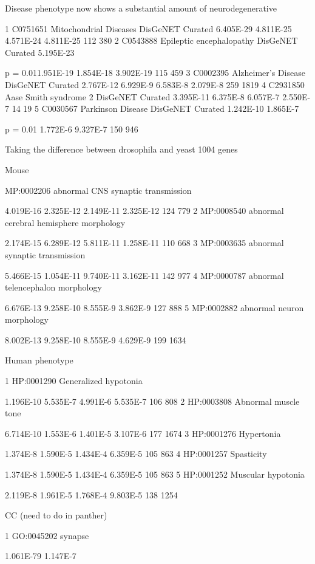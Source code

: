 Disease phenotype now shows a substantial amount of neurodegenerative


1 
C0751651 
Mitochondrial Diseases 
DisGeNET Curated 
6.405E-29 
4.811E-25 
4.571E-24 
4.811E-25 
112 
380 
2 
C0543888 
Epileptic encephalopathy 
DisGeNET Curated 
5.195E-23 


p = 0.011.951E-19 
1.854E-18 
3.902E-19 
115 
459 
3 
C0002395 
Alzheimer's Disease 
DisGeNET Curated 
2.767E-12 
6.929E-9 
6.583E-8 
2.079E-8 
259 
1819 
4 
C2931850 
Aase Smith syndrome 2 
DisGeNET Curated 
3.395E-11 
6.375E-8 
6.057E-7 
2.550E-7 
14 
19 
5 
C0030567 
Parkinson Disease 
DisGeNET Curated 
1.242E-10 
1.865E-7

p = 0.01 
1.772E-6 
9.327E-7 
150 
946


Taking the difference between drosophila and yeast 1004 genes

Mouse



MP:0002206 
abnormal CNS synaptic transmission 

4.019E-16 
2.325E-12 
2.149E-11 
2.325E-12 
124 
779 
2 
MP:0008540 
abnormal cerebral hemisphere morphology 

2.174E-15 
6.289E-12 
5.811E-11 
1.258E-11 
110 
668 
3 
MP:0003635 
abnormal synaptic transmission 

5.466E-15 
1.054E-11 
9.740E-11 
3.162E-11 
142 
977 
4 
MP:0000787 
abnormal telencephalon morphology 

6.676E-13 
9.258E-10 
8.555E-9 
3.862E-9 
127 
888 
5 
MP:0002882 
abnormal neuron morphology 

8.002E-13 
9.258E-10 
8.555E-9 
4.629E-9 
199 
1634

Human phenotype


1 
HP:0001290 
Generalized hypotonia 

1.196E-10 
5.535E-7 
4.991E-6 
5.535E-7 
106 
808 
2 
HP:0003808 
Abnormal muscle tone 

6.714E-10 
1.553E-6 
1.401E-5 
3.107E-6 
177 
1674 
3 
HP:0001276 
Hypertonia 

1.374E-8 
1.590E-5 
1.434E-4 
6.359E-5 
105 
863 
4 
HP:0001257 
Spasticity 

1.374E-8 
1.590E-5 
1.434E-4 
6.359E-5 
105 
863 
5 
HP:0001252 
Muscular hypotonia 

2.119E-8 
1.961E-5 
1.768E-4 
9.803E-5 
138 
1254

CC (need to do in panther)


1 
GO:0045202 
synapse 

1.061E-79 
1.147E-7

